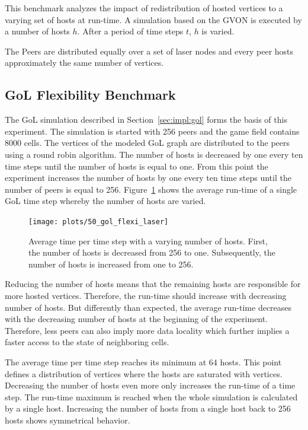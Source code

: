 This benchmark analyzes the impact of redistribution of hosted
vertices to a varying set of hosts at run-time. A simulation based on the
GVON is executed by a number of hosts $h$. After a period of time steps
$t$, $h$ is varied.

The Peers are distributed equally over a set of laser nodes and
every peer hosts approximately the same number of vertices.

\subsection{GoL Flexibility Benchmark}

The GoL simulation described in Section~\ref{sec:impl:gol} forms the
basis of this experiment.  The simulation is started with 256 peers
and the game field contains 8000 cells. The vertices of the modeled
GoL graph are distributed to the peers using a round robin algorithm.  The
number of hosts is decreased by one every ten time steps until the
number of hosts is equal to one. From this point the experiment
increases the number of hosts by one every ten time steps until the
number of peers is equal to 256. Figure~\ref{fig:gol_flexi_laser}
shows the average run-time of a single GoL time step whereby the
number of hosts are varied.

\begin{figure}[H]
  \texttt{[image: plots/50\_gol\_flexi\_laser]}
  \caption{Average time per time step with a varying number of
    hosts. First, the number of hosts is decreased from 256 to
    one. Subsequently, the number of hosts is increased from one to 256.}
  \label{fig:gol_flexi_laser}
\end{figure}

\noindent Reducing the number of hosts means that the remaining hosts are
responsible for more hosted vertices. Therefore, the run-time should increase
with decreasing number of hosts.  But differently than expected, the
average run-time decreases with the decreasing number of hosts at the
beginning of the experiment. Therefore, less peers can also imply more
data locality which further implies a faster access to the state of
neighboring cells.

The average time per time step reaches its minimum at 64 hosts. This
point defines a distribution of vertices where the hosts are saturated
with vertices.  Decreasing the number of hosts even more only
increases the run-time of a time step. The run-time maximum is reached
when the whole simulation is calculated by a single host.  Increasing
the number of hosts from a single host back to 256 hosts shows
symmetrical behavior.




\cleardoublepage

